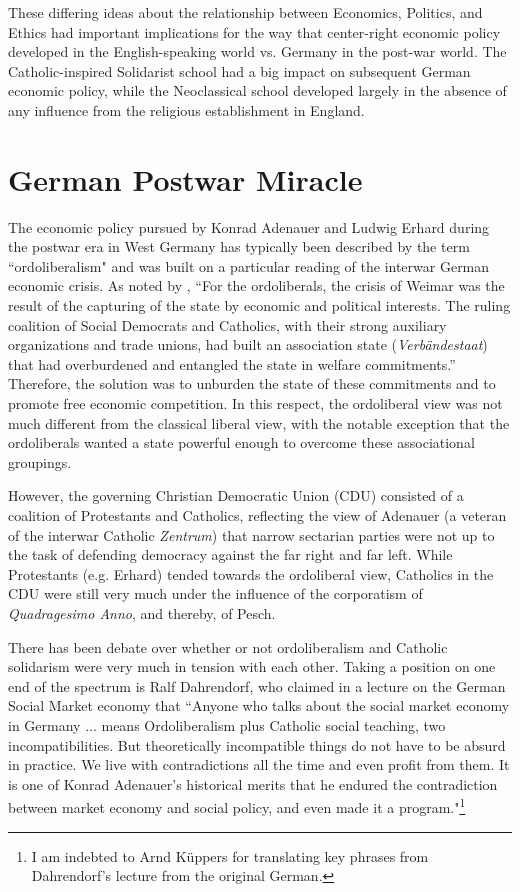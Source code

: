 \documentclass{article}
\begin{document}
These differing ideas about the relationship between Economics, Politics, and Ethics had important implications for the way that center-right economic policy developed in the English-speaking world vs. Germany in the post-war world.  The Catholic-inspired Solidarist school had a big impact on subsequent German economic policy, while the Neoclassical school developed largely in the absence of any influence from the religious establishment in England.

\section{German Postwar Miracle}

The economic policy pursued by Konrad Adenauer and Ludwig Erhard during the postwar era in West Germany has typically been described by the term ``ordoliberalism" and was built on a particular reading of the interwar German economic crisis.  As noted by \citet[p. 351]{hien2013}, “For the ordoliberals, the crisis of Weimar was the result of the capturing of the state by economic and political interests.  The ruling coalition of Social Democrats and Catholics, with their strong auxiliary organizations and trade unions, had built an association state (\emph{Verb\"{a}ndestaat}) that had overburdened and entangled the state in welfare commitments.”  Therefore, the solution was to unburden the state of these commitments and to promote free economic competition.  In this respect, the ordoliberal view was not much different from the classical liberal view, with the notable exception that the ordoliberals wanted a state powerful enough to overcome these associational groupings.\medskip

However, the governing Christian Democratic Union (CDU) consisted of a coalition of Protestants and Catholics, reflecting the view of Adenauer (a veteran of the interwar Catholic \emph{Zentrum}) that narrow sectarian parties were not up to the task of defending democracy against the far right and far left.  While Protestants (e.g. Erhard) tended towards the ordoliberal view, Catholics in the CDU were still very much under the influence of the corporatism of \emph{Quadragesimo Anno}, and thereby, of Pesch.\medskip

There has been debate over whether or not ordoliberalism and Catholic solidarism were very much in tension with each other.  Taking a position on one end of the spectrum is Ralf Dahrendorf, who claimed in a lecture on the German Social Market economy that ``Anyone who talks about the social market economy in Germany ... means Ordoliberalism plus Catholic social teaching, two incompatibilities. But theoretically incompatible things do not have to be absurd in practice. We live with contradictions all the time and even profit from them. It is one of Konrad Adenauer's historical merits that he endured the contradiction between market economy and social policy, and even made it a program."\footnote{I am indebted to Arnd K\"{u}ppers for translating key phrases from Dahrendorf's lecture from the original German.} \citep{dahrendorf2004} \medskip
\end{document}
